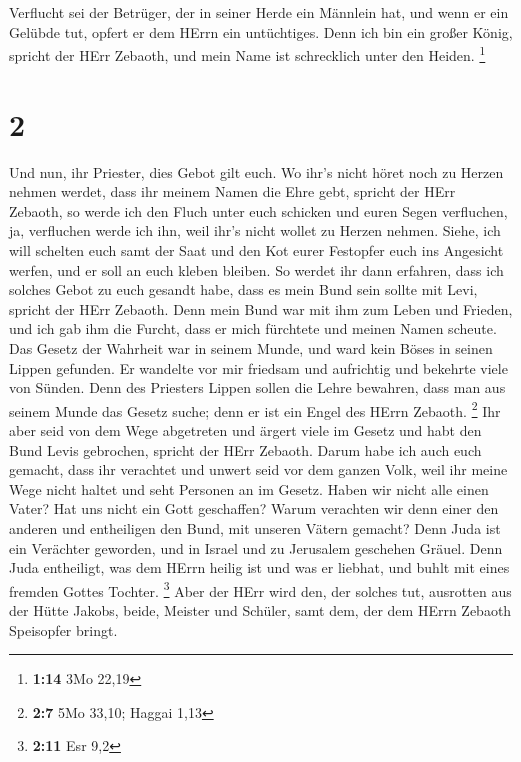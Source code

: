  Verflucht sei der Betrüger, der in seiner Herde ein
Männlein hat, und wenn er ein Gelübde tut, opfert er dem HErrn ein
untüchtiges. Denn ich bin ein großer König, spricht der HErr Zebaoth,
und mein Name ist schrecklich unter den Heiden. \footnote{\textbf{1:14}
  3Mo 22,19}

\hypertarget{section-1}{%
\section{2}\label{section-1}}

 Und nun, ihr Priester, dies Gebot gilt euch. 
Wo ihr's nicht höret noch zu Herzen nehmen werdet, dass ihr meinem Namen
die Ehre gebt, spricht der HErr Zebaoth, so werde ich den Fluch unter
euch schicken und euren Segen verfluchen, ja, verfluchen werde ich ihn,
weil ihr's nicht wollet zu Herzen nehmen.  Siehe, ich will
schelten euch samt der Saat und den Kot eurer Festopfer euch ins
Angesicht werfen, und er soll an euch kleben bleiben.  So
werdet ihr dann erfahren, dass ich solches Gebot zu euch gesandt habe,
dass es mein Bund sein sollte mit Levi, spricht der HErr Zebaoth.
 Denn mein Bund war mit ihm zum Leben und Frieden, und ich
gab ihm die Furcht, dass er mich fürchtete und meinen Namen scheute.
 Das Gesetz der Wahrheit war in seinem Munde, und ward kein
Böses in seinen Lippen gefunden. Er wandelte vor mir friedsam und
aufrichtig und bekehrte viele von Sünden.  Denn des
Priesters Lippen sollen die Lehre bewahren, dass man aus seinem Munde
das Gesetz suche; denn er ist ein Engel des HErrn Zebaoth. \footnote{\textbf{2:7}
  5Mo 33,10; Haggai 1,13}  Ihr aber seid von dem Wege
abgetreten und ärgert viele im Gesetz und habt den Bund Levis gebrochen,
spricht der HErr Zebaoth.  Darum habe ich auch euch gemacht,
dass ihr verachtet und unwert seid vor dem ganzen Volk, weil ihr meine
Wege nicht haltet und seht Personen an im Gesetz.  Haben
wir nicht alle einen Vater? Hat uns nicht ein Gott geschaffen? Warum
verachten wir denn einer den anderen und entheiligen den Bund, mit
unseren Vätern gemacht?  Denn Juda ist ein Verächter
geworden, und in Israel und zu Jerusalem geschehen Gräuel. Denn Juda
entheiligt, was dem HErrn heilig ist und was er liebhat, und buhlt mit
eines fremden Gottes Tochter. \footnote{\textbf{2:11} Esr 9,2}
 Aber der HErr wird den, der solches tut, ausrotten aus der
Hütte Jakobs, beide, Meister und Schüler, samt dem, der dem HErrn
Zebaoth Speisopfer bringt.


